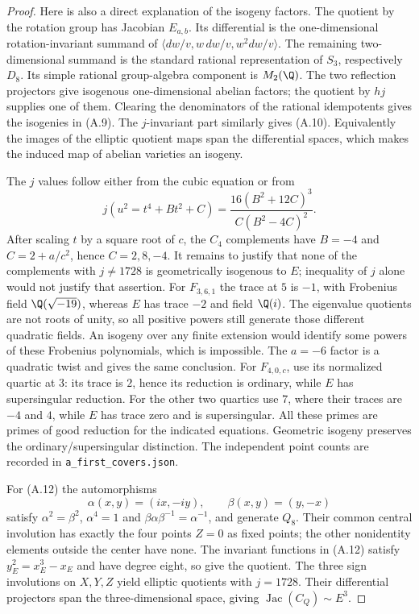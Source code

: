 \begin{proof}
Here is also a direct explanation of the isogeny factors. The quotient
by the rotation group has Jacobian $E_{a,b}$. Its differential is the
one-dimensional rotation-invariant summand of
$\langle dw/v,w\,dw/v,w^2dw/v\rangle$. The remaining two-dimensional
summand is the standard rational representation of $S_3$, respectively
$D_8$. Its simple rational group-algebra component is $M_2(\Q)$.
The two reflection projectors give isogenous one-dimensional abelian
factors; the quotient by $hj$ supplies one of them. Clearing the
denominators of the rational idempotents gives the isogenies in (A.9).
The $j$-invariant part similarly gives (A.10). Equivalently the images
of the elliptic quotient maps span the differential spaces, which
makes the induced map of abelian varieties an isogeny.

The $j$ values follow either from the cubic equation or from
\[
 j(u^2=t^4+Bt^2+C)=
       \frac{16(B^2+12C)^3}{C(B^2-4C)^2}.
\]
After scaling $t$ by a square root of $c$, the $C_4$ complements
have $B=-4$ and $C=2+a/c^2$, hence $C=2,8,-4$.
It remains to justify that none of the complements with $j\ne1728$
is geometrically isogenous to $E$; inequality of $j$ alone would
not justify that assertion. For $F_{3,6,1}$ the trace at $5$ is
$-1$, with Frobenius field $\Q(\sqrt{-19})$, whereas $E$ has
trace $-2$ and field $\Q(i)$. The eigenvalue quotients are not
roots of unity, so all positive powers still generate those
different quadratic fields. An isogeny over any finite extension
would identify some powers of these Frobenius polynomials, which
is impossible. The $a=-6$ factor is a quadratic twist and gives
the same conclusion. For $F_{4,0,c}$, use its normalized quartic
at $3$: its trace is $2$, hence its reduction is ordinary, while
$E$ has supersingular reduction. For the other two quartics use
$7$, where their traces are $-4$ and $4$, while $E$ has trace zero
and is supersingular. All these primes are primes of good reduction
for the indicated equations. Geometric isogeny preserves the
ordinary/supersingular distinction. The independent point counts
are recorded in \texttt{a\_first\_covers.json}.

For (A.12) the automorphisms
\[
 \alpha(x,y)=(ix,-iy),\qquad \beta(x,y)=(y,-x)
\]
satisfy $\alpha^2=\beta^2$, $\alpha^4=1$ and
$\beta\alpha\beta^{-1}=\alpha^{-1}$, and generate $Q_8$.
Their common central involution has exactly the four points $Z=0$
as fixed points; the other nonidentity elements outside the center
have none. The invariant functions in (A.12) satisfy $y_E^2=x_E^3-x_E$
and have degree eight, so give the quotient. The three sign
involutions on $X,Y,Z$ yield elliptic quotients with $j=1728$.
Their differential projectors span the three-dimensional space,
giving $\operatorname{Jac}(C_Q)\sim E^3$.


\end{proof}
